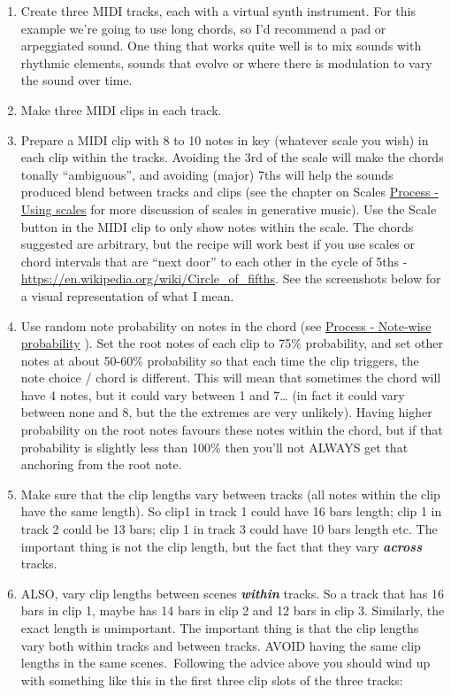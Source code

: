 \documentclass[
  12pt,
  letterpaper,
  oneside,
  open=any]{scrbook}
\begin{document}
\begin{enumerate}
\def\labelenumi{\arabic{enumi}.}
\item
  Create three MIDI tracks, each with a virtual synth instrument. For
  this example we're going to use long chords, so I'd recommend a pad or
  arpeggiated sound. One thing that works quite well is to mix sounds
  with rhythmic elements, sounds that evolve or where there is
  modulation to vary the sound over time.
\item
  Make three MIDI clips in each track.
\item
  Prepare a MIDI clip with 8 to 10 notes in key (whatever scale you
  wish) in each clip within the tracks. Avoiding the 3rd of the scale
  will make the chords tonally ``ambiguous'', and avoiding (major) 7ths
  will help the sounds produced blend between tracks and clips (see the
  chapter on Scales \hyperref[018-Process-Scales]{Process - Using
  scales} for more discussion of scales in generative music). Use the
  Scale button in the MIDI clip to only show notes within the scale. The
  chords suggested are arbitrary, but the recipe will work best if you
  use scales or chord intervals that are ``next door'' to each other in
  the cycle of 5ths -
  \url{https://en.wikipedia.org/wiki/Circle_of_fifths}. See the
  screenshots below for a visual representation of what I mean.
\item
  Use random note probability on notes in the chord (see
  \hyperref[002-Process-Note_wise_probability]{Process - Note-wise
  probability} ). Set the root notes of each clip to 75\% probability,
  and set other notes at about 50-60\% probability so that each time the
  clip triggers, the note choice / chord is different. This will mean
  that sometimes the chord will have 4 notes, but it could vary between
  1 and 7\ldots{} (in fact it could vary between none and 8, but the the
  extremes are very unlikely). Having higher probability on the root
  notes favours these notes within the chord, but if that probability is
  slightly less than 100\% then you'll not ALWAYS get that anchoring
  from the root note.
\item
  Make sure that the clip lengths vary between tracks (all notes within
  the clip have the same length). So clip1 in track 1 could have 16 bars
  length; clip 1 in track 2 could be 13 bars; clip 1 in track 3 could
  have 10 bars length etc. The important thing is not the clip length,
  but the fact that they vary \textbf{\emph{across}} tracks.
\item
  ALSO, vary clip lengths between scenes \textbf{\emph{within}} tracks.
  So a track that has 16 bars in clip 1, maybe has 14 bars in clip 2 and
  12 bars in clip 3. Similarly, the exact length is unimportant. The
  important thing is that the clip lengths vary both within tracks and
  between tracks. AVOID having the same clip lengths in the same
  scenes.~Following the advice above you should wind up with something
  like this in the first three clip slots of the three tracks:
\end{enumerate}
\end{document}
